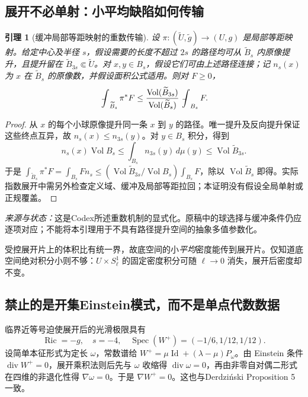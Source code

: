 \documentclass[UTF8,a4paper,11pt,fontset=fandol]{ctexart}
\numberwithin{equation}{section}
\newtheorem{lemma}[theorem]{引理}
\theoremstyle{definition}
\newcommand{\Ric}{\operatorname{Ric}}
\newcommand{\Vol}{\operatorname{Vol}}
\newcommand{\spec}{\operatorname{Spec}}
\newcommand{\Id}{\operatorname{Id}}
\newcommand{\fint}{\mathop{\rlap{\,\raisebox{0.1ex}{\tiny$-$}}\int}\nolimits}
\newcommand{\source}[1]{\par\noindent\textit{来源与状态：}#1\par}
\begin{document}
\subsection{展开不必单射：小平均缺陷如何传输}
\begin{lemma}[缓冲局部等距映射的重数传输]\label{lem:transport}
设 $\pi:(\widetilde U,\widetilde g)\to(U,g)$ 是局部等距映射。给定中心及半径 $s$，假设需要的长度不超过 $2s$ 的路径均可从 $\widetilde B_s$ 内原像提升，且提升留在 $\widetilde B_{3s}\Subset\widetilde U$。对 $x,y\in B_s$，假设它们可由上述路径连接；记 $n_s(x)$ 为 $x$ 在 $\widetilde B_s$ 的原像数，并假设面积公式适用。则对 $F\ge0$，
\begin{equation}\label{eq:transport}
\fint_{\widetilde B_s}\pi^*F\le
\frac{\Vol(\widetilde B_{3s})}{\Vol(\widetilde B_s)}\fint_{B_s}F.
\end{equation}
\end{lemma}
\begin{proof}
从 $x$ 的每个小球原像提升同一条 $x$ 到 $y$ 的路径。唯一提升及反向提升保证这些终点互异，故 $n_s(x)\le n_{3s}(y)$。对 $y\in B_s$ 积分，得到
\[
n_s(x)\Vol B_s\le\int_{B_s}n_{3s}(y)\,d\mu(y)\le\Vol\widetilde B_{3s}.
\]
于是 $\int_{\widetilde B_s}\pi^*F=\int_{B_s}F n_s\le(\Vol\widetilde B_{3s}/\Vol B_s)\int_{B_s}F$，除以 $\Vol\widetilde B_s$ 即得。实际指数展开中需另外检查定义域、缓冲及局部等距拉回；本证明没有假设全局单射或正规覆盖。
\end{proof}
\source{这是Codex所述重数机制的显式化。原稿中的球选择与缓冲条件仍应逐项对应；不能将本引理用于不具有路径提升空间的抽象多值参数化。}

受控展开片上的体积比有统一界，故底空间的小\emph{平均}密度能传到展开片。仅知道底空间绝对积分小则不够：$U\times S^1_\ell$ 的固定密度积分可随 $\ell\to0$ 消失，展开后密度却不变。

\subsection{禁止的是开集Einstein模式，而不是单点代数数据}
临界近等号迫使展开后的光滑极限具有
\begin{equation}\label{eq:forbidden}
\Ric=-g,\quad s=-4,\quad
\spec(W^+)=(-1/6,1/12,1/12).
\end{equation}
设简单本征形式为定长 $\omega$，常数谱给 $W^+=\mu\Id+(\lambda-\mu)P_\omega$。由 Einstein 条件 $\operatorname{div}W^+=0$，展开乘积法则后先与 $\omega$ 收缩得 $\operatorname{div}\omega=0$，再由非零自对偶二形式在四维的非退化性得 $\nabla\omega=0$。于是 $\nabla W^+=0$。这也与Derdzi\'nski Proposition 5一致\cite{Derdzinski}。
\end{document}
